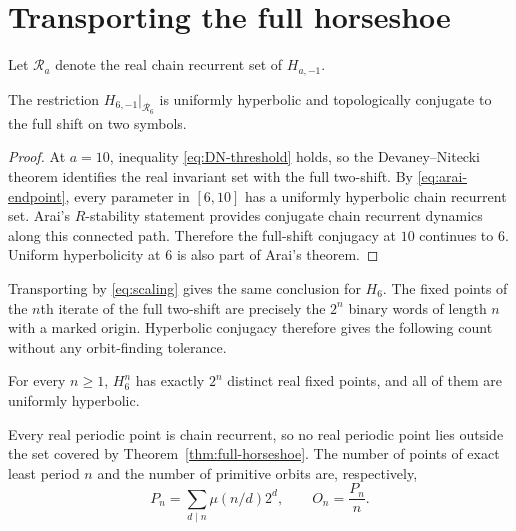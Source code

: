 \section{Transporting the full horseshoe}\label{sec:horseshoe}

Let $\mathcal R_a$ denote the real chain recurrent set of $H_{a,-1}$.

\begin{theorem}[Full horseshoe at $a=6$]\label{thm:full-horseshoe}
The restriction $H_{6,-1}|_{\mathcal R_6}$ is uniformly hyperbolic and
topologically conjugate to the full shift on two symbols.
\end{theorem}

\begin{proof}
At $a=10$, inequality \eqref{eq:DN-threshold} holds, so the
Devaney--Nitecki theorem identifies the real invariant set with the full
two-shift.  By \eqref{eq:arai-endpoint}, every parameter in $[6,10]$ has a
uniformly hyperbolic chain recurrent set.  Arai's $R$-stability statement
provides conjugate chain recurrent dynamics along this connected path.
Therefore the full-shift conjugacy at $10$ continues to $6$.  Uniform
hyperbolicity at $6$ is also part of Arai's theorem.
\end{proof}

Transporting by \eqref{eq:scaling} gives the same conclusion for $H_6$.
The fixed points of the $n$th iterate of the full two-shift are precisely the
$2^n$ binary words of length $n$ with a marked origin.  Hyperbolic conjugacy
therefore gives the following count without any orbit-finding tolerance.

\begin{corollary}\label{cor:real-count}
For every $n\ge1$, $H_6^n$ has exactly $2^n$ distinct real fixed points, and
all of them are uniformly hyperbolic.
\end{corollary}

Every real periodic point is chain recurrent, so no real periodic point lies
outside the set covered by Theorem~\ref{thm:full-horseshoe}.  The number of
points of exact least period $n$ and the number of primitive orbits are,
respectively,
\begin{equation}\label{eq:primitive-full-shift}
P_n=\sum_{d\mid n}\mu(n/d)2^d,
\qquad
O_n=\frac{P_n}{n}.
\end{equation}
